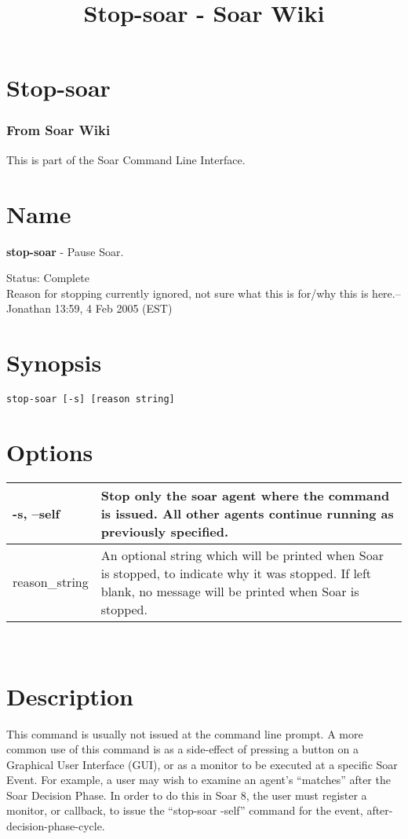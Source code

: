 \documentclass[10pt]{article}
\title{Stop-soar - Soar Wiki}
\begin{document}
\section*{Stop-soar}
\subsubsection*{From Soar Wiki}


 This is part of the Soar Command Line Interface. 
\section*{ Name }


 \textbf{stop-soar}
 - Pause Soar. 


 Status: Complete\\ 
Reason for stopping currently ignored, not sure what this is for/why this is here.--Jonathan 13:59, 4 Feb 2005 (EST) 
\section*{ Synopsis }
\begin{verbatim}
stop-soar [-s] [reason string]

\end{verbatim}
\section*{ Options }


\begin{tabular}{|p{1in}|p{5in}|}
\hline 
 -s, --self  & Stop only the soar agent where the command is issued. All other agents continue running as previously specified.  \\
 \hline 
 reason\_string  & An optional string which will be printed when Soar is stopped, to indicate why it was stopped. If left blank, no message will be printed when Soar is stopped.  \\
 \hline 

\end{tabular}



 \\ 

\section*{ Description }


 This command is usually not issued at the command line prompt. A more common use of this command is as a side-effect of pressing a button on a Graphical User Interface (GUI), or as a monitor to be executed at a specific Soar Event. For example, a user may wish to examine an agent's ``matches'' after the Soar Decision Phase. In order to do this in Soar 8, the user must register a monitor, or callback, to issue the ``stop-soar -self'' command for the event, after-decision-phase-cycle. 
\end{document}
